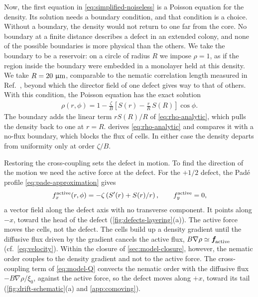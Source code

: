 \documentclass[aps,pre,reprint,superscriptaddress,longbibliography,nofootinbib
]{revtex4-2}
\begin{document}
Now, the first equation in \cref{eq:simplified-noiseless}
is a Poisson equation for the density. Its solution needs a
boundary condition, and that condition is a choice. Without
a boundary, the density would not return to one far from
the core. No boundary at a finite distance describes a
defect in an extended colony, and none of the possible
boundaries is more physical than the others. We take the
boundary to be a reservoir: on a circle of radius $R$ we
impose $\rho=1$, as if the region inside the boundary were
embedded in a monolayer held at this density. We take
$R=20~\upmu\mathrm{m}$, comparable to the nematic correlation
length measured in Ref.~\cite{copenhagen2021}, beyond which
the director field of one defect gives way to that of
others. With this condition, the Poisson equation has the
exact solution
\begin{align}
  \label{eq:rho-analytic}
  \rho(r,\phi) = 1 - \frac{\zeta}{B}\left[ S(r) - \frac rR\,S(R)\right]\cos \phi.
\end{align}
The boundary adds the linear term $r S(R)/R$ of
\cref{eq:rho-analytic}, which pulls the density back to one
at $r=R$.  derives
\cref{eq:rho-analytic} and compares it with a no-flux
boundary, which blocks the flux of cells. In either case
the density departs from uniformity only at order
$\zeta/B$.

Restoring the cross-coupling sets the defect in motion. To
find the direction of the motion we need the active force
at the defect. For the $+1/2$ defect, the Pad\'e profile
\cref{eq:pade-approximation} gives
\begin{align}
  \label{eq:active-force-defect}
 {f}^\text{active}_x(r, \phi) = -\zeta \left(S'(r) +S(r)/r\right),
  \qquad{f}^\text{active}_y = 0,
\end{align}
a vector field along the defect axis with no transverse
component. It points along $-x$, toward the head of the
defect (\cref{fig:defects-layering}(a)). The active force
moves the cells, not the defect. The cells build up a
density gradient until the diffusive flux driven by the
gradient cancels the active flux, $B\nabla\rho\simeq\boldsymbol{f}_\text{\!active}$
(cf.~\cref{eq:velocity}). Within the closure of
\cref{sec:model-closure}, however, the nematic order
couples to the density gradient and not to the active
force. The cross-coupling term of \cref{eq:model-Q}
convects the nematic order with the diffusive flux
$-B\nabla\rho/\xi_0$, against the active force, so the
defect moves along $+x$, toward its tail
(\cref{fig:drift-schematic}(a) and \cref{app:comoving}).
\end{document}
